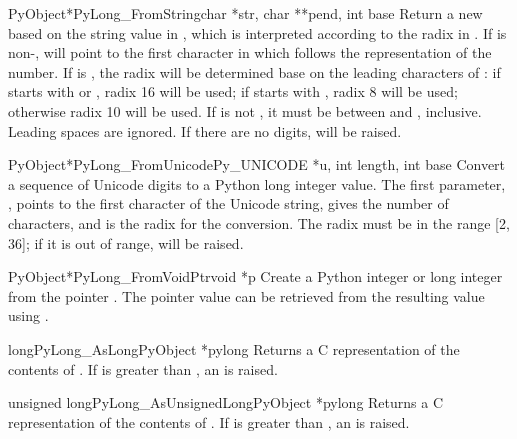 \begin{cfuncdesc}{PyObject*}{PyLong_FromString}{char *str, char **pend,
                                                int base}
  Return a new  based on the string value in
  , which is interpreted according to the radix in
  .  If  is non-\NULL,  will
  point to the first character in  which follows the
  representation of the number.  If  is , the radix
  will be determined base on the leading characters of : if
   starts with  or , radix 16 will be
  used; if  starts with , radix 8 will be used;
  otherwise radix 10 will be used.  If  is not , it
  must be between  and , inclusive.  Leading spaces
  are ignored.  If there are no digits,  will be
  raised.
\end{cfuncdesc}

\begin{cfuncdesc}{PyObject*}{PyLong_FromUnicode}{Py_UNICODE *u,
                                                 int length, int base}
  Convert a sequence of Unicode digits to a Python long integer
  value.  The first parameter, , points to the first character
  of the Unicode string,  gives the number of characters,
  and  is the radix for the conversion.  The radix must be
  in the range [2, 36]; if it is out of range, 
  will be raised.
\end{cfuncdesc}

\begin{cfuncdesc}{PyObject*}{PyLong_FromVoidPtr}{void *p}
  Create a Python integer or long integer from the pointer .
  The pointer value can be retrieved from the resulting value using
  .
\end{cfuncdesc}

\begin{cfuncdesc}{long}{PyLong_AsLong}{PyObject *pylong}
  Returns a C  representation of the contents of
  .  If  is greater than
  , an 
  is raised.
\end{cfuncdesc}

\begin{cfuncdesc}{unsigned long}{PyLong_AsUnsignedLong}{PyObject *pylong}
  Returns a C  representation of the contents of
  .  If  is greater than
  , an
   is raised.
\end{cfuncdesc}

